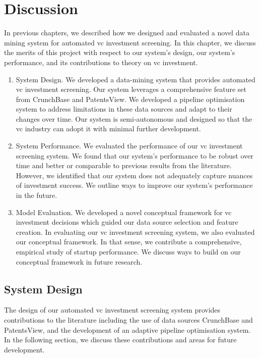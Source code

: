 \documentclass[../thesis/thesis.tex]{subfiles}
\begin{document}
\chapter{Discussion}
\label{chap:discussion}

In previous chapters, we described how we designed and evaluated a novel data mining system for automated \gls{vc} investment screening. In this chapter, we discuss the merits of this project with respect to our system's design, our system's performance, and its contributions to theory on \gls{vc} investment.

\begin{enumerate}

\item System Design. We developed a data-mining system that provides automated \gls{vc} investment screening. Our system leverages a comprehensive feature set from CrunchBase and PatentsView. We developed a pipeline optimisation system to address limitations in these data sources and adapt to their changes over time. Our system is semi-autonomous and designed so that the \gls{vc} industry can adopt it with minimal further development.

\item System Performance. We evaluated the performance of our \gls{vc} investment screening system. We found that our system's performance to be robust over time and better or comparable to previous results from the literature. However, we identified that our system does not adequately capture nuances of investment success. We outline ways to improve our system's performance in the future.

\item Model Evaluation. We developed a novel conceptual framework for \gls{vc} investment decisions which guided our data source selection and feature creation. In evaluating our \gls{vc} investment screening system, we also evaluated our conceptual framework. In that sense, we contribute a comprehensive, empirical study of startup performance. We discuss ways to build on our conceptual framework in future research.

\end{enumerate}

\section{System Design}

The design of our automated \gls{vc} investment screening system provides contributions to the literature including the use of data sources CrunchBase and PatentsView, and the development of an adaptive pipeline optimisation system. In the following section, we discuss these contributions and areas for future development.
\end{document}
